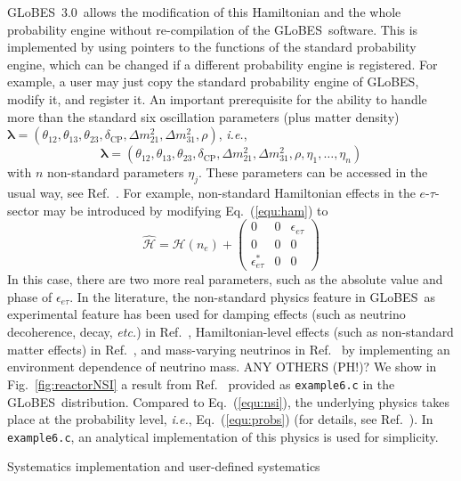 \documentclass[12pt,a4paper]{article}
\makeatletter
\renewcommand{\section}{\@startsection{section}{1}{0em}{-\baselineskip}%
{\baselineskip}{\normalfont\large\bfseries}}
\newcommand{\ie}{{\it i.e.}}
\newcommand{\etc}{{\it etc.}}
\newcommand{\eq}{Eq.}
\newcommand{\fig}{Fig.}
\newcommand{\Ref}{Ref.}
\newcommand{\ldm}{\Delta m_{31}^2}
\newcommand{\sdm}{\Delta m_{21}^2}
\newcommand{\deltacp}{\delta_{\mathrm{CP}}}
\newcommand{\GLOBES}{{\sf GLoBES}}
\newcommand{\GLOBESN}{{\sf GLoBES~3.0}}
\newcommand{\equ}[1]{\eq~(\ref{equ:#1})}
\newcommand{\figu}[1]{\fig~\ref{fig:#1}}
\makeatother
\begin{document}
\GLOBESN\ allows the modification of this Hamiltonian and the whole probability engine without
re-compilation of the \GLOBES\ software. This is implemented
by using pointers to the functions of the standard probability engine, which can be changed if
a different probability engine is registered. For example, a user may just copy the standard probability
engine of \GLOBES , modify it, and register it. An important prerequisite for the ability to handle
more than the standard six oscillation parameters (plus matter density) $\boldsymbol{\lambda}=(\theta_{12},\theta_{13}, \theta_{23}, \deltacp, \sdm, \ldm, \rho)$, \ie,
\begin{equation}
\boldsymbol{\lambda}=(\theta_{12},\theta_{13}, \theta_{23}, \deltacp, \sdm, \ldm, \rho, \eta_1, \hdots, \eta_n)
\end{equation}
with $n$ non-standard parameters $\eta_j$. These parameters can be accessed in the usual way, see \Ref~\cite{Manual}.
For example, non-standard Hamiltonian effects in the $e$-$\tau$-sector may be introduced by modifying \equ{ham} to
\begin{equation}
 \mathcal{\hat{H}} = \mathcal{H}(n_e) + 
\left(
\begin{array}{ccc}
0 & 0 & \epsilon_{e \tau} \\
0 & 0 & 0 \\
\epsilon_{e \tau}^* & 0 & 0 
\end{array}
\right)
\label{equ:nsi}
\end{equation}
In this case, there are two more real parameters, such as the absolute value and phase of $\epsilon_{e \tau}$.
In the literature, the non-standard physics feature in \GLOBES\ as experimental feature has been used for damping effects (such as neutrino decoherence, decay, \etc) in \Ref~\cite{Blennow:2005yk}, Hamiltonian-level effects (such as non-standard matter effects) in \Ref~\cite{Blennow:2005qj}, and mass-varying neutrinos in \Ref~\cite{Schwetz:2005fy} by implementing an environment dependence of neutrino mass.  ANY OTHERS (PH!)?
We show in \figu{reactorNSI} a result from \Ref~\cite{Blennow:2005yk} provided as {\tt example6.c} in the \GLOBES\
distribution. Compared to \equ{nsi}, the underlying physics takes place at the probability level, \ie, 
\equ{probs} (for details, see \Ref~\cite{Blennow:2005yk}). In {\tt example6.c}, an analytical implementation
of this physics is used for simplicity.

\section{Systematics implementation and user-defined systematics}
\end{document}
